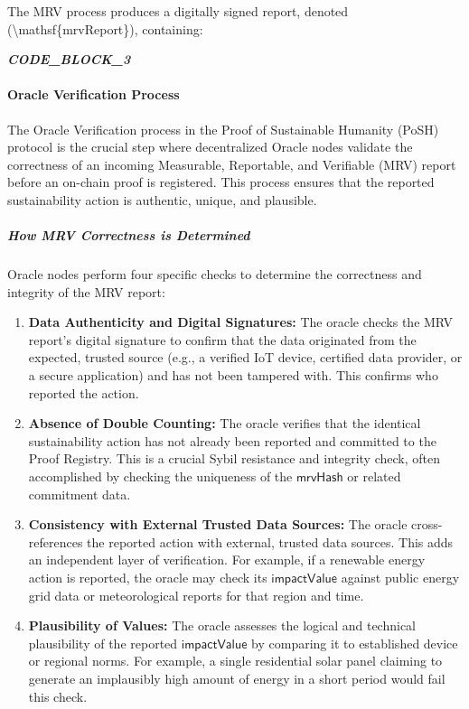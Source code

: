 \documentclass{article}
\begin{document}
The MRV process produces a digitally signed report, denoted
({\textbackslash}mathsf\{mrvReport\}), containing:

\textit{\textbf{CODE\_BLOCK\_3}}

\paragraph{Oracle Verification Process}

The Oracle Verification process in the Proof of Sustainable Humanity (PoSH) protocol is the crucial step where decentralized Oracle nodes validate the correctness of an incoming Measurable, Reportable, and Verifiable (MRV) report before an on-chain proof is registered. This process ensures that the reported sustainability action is authentic, unique, and plausible.

\subparagraph{How MRV Correctness is Determined}

Oracle nodes perform four specific checks to determine the correctness and integrity of the MRV report:

\begin{enumerate}
\item \textbf{Data Authenticity and Digital Signatures:}
The oracle checks the MRV report's digital signature to confirm that the data originated from the expected, trusted source (e.g., a verified IoT device, certified data provider, or a secure application) and has not been tampered with. This confirms who reported the action.
\item \textbf{Absence of Double Counting:}
The oracle verifies that the identical sustainability action has not already been reported and committed to the Proof Registry. This is a crucial Sybil resistance and integrity check, often accomplished by checking the uniqueness of the $\mathsf{mrvHash}$ or related commitment data.
\item \textbf{Consistency with External Trusted Data Sources:}
The oracle cross-references the reported action with external, trusted data sources. This adds an independent layer of verification. For example, if a renewable energy action is reported, the oracle may check its $\mathsf{impactValue}$ against public energy grid data or meteorological reports for that region and time.
\item \textbf{Plausibility of Values:}
The oracle assesses the logical and technical plausibility of the reported $\mathsf{impactValue}$ by comparing it to established device or regional norms. For example, a single residential solar panel claiming to generate an implausibly high amount of energy in a short period would fail this check.
\end{enumerate}
\end{document}
